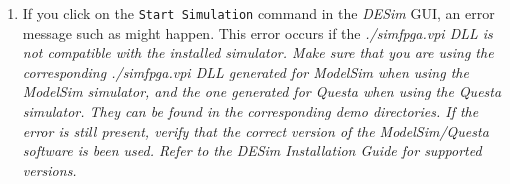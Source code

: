 \begin{enumerate}
\item If you click on the \texttt{Start Simulation} command in the {\it DESim} GUI,
an error message such as  might happen.
This error occurs if the \it{./simfpga.vpi} DLL is not compatible with the installed simulator.
Make sure that you are using the corresponding \it{./simfpga.vpi} DLL generated for 
{\it ModelSim} when using the {\it ModelSim} simulator, and the one generated for
{\it Questa} when using the {\it Questa} simulator. They can be found in the corresponding
demo directories. If the error is still present, verify that the correct version of the
{\it ModelSim/Questa} software is been used. Refer to the {\it DESim} Installation
Guide for supported versions.
\end{enumerate}






